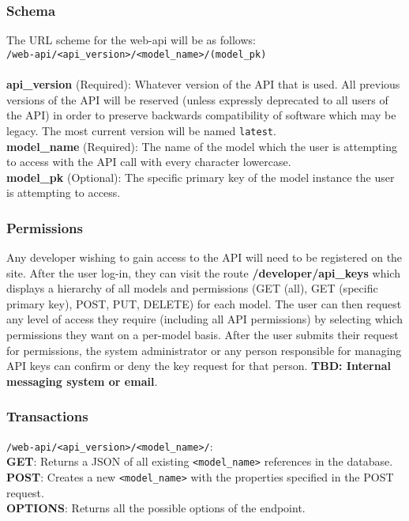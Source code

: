 \documentclass{article}
\begin{document}
\subsubsection{Schema}
The URL scheme for the web-api will be as follows:
\\ \texttt{/web-api/<api\_version>/<model\_name>/(model\_pk)}
\\
\\
\textbf{api\_version} (Required): Whatever version of the API that is used. All
previous versions of the API will be reserved (unless expressly deprecated to
all users of the API) in order to preserve backwards compatibility of software
which may be legacy. The most current version will be named \texttt{latest}.
\\
\textbf{model\_name} (Required): The name of the model which the user is
attempting to access with the API call with every character lowercase.
\\
\textbf{model\_pk} (Optional): The specific primary key of the model instance
the user is attempting to access. %

\subsubsection{Permissions}
Any developer wishing to gain access to the API will need to be registered on
the site. After the user log-in, they can visit the route
\textbf{/developer/api\_keys} which displays a hierarchy of all models and
permissions (GET (all), GET (specific primary key), POST, PUT, DELETE) for each
model. The user can then request any level of access they require (including
all API permissions) by selecting which permissions they want on a per-model
basis. After the user submits their request for permissions, the system
administrator or any person responsible for managing API keys can confirm or
deny the key request for that person. \textbf{TBD: Internal messaging system or
email}. %

\subsubsection{Transactions}
\texttt{/web-api/<api\_version>/<model\_name>/}:
\\
\textbf{GET}: Returns a JSON of all existing \texttt{<model\_name>} references in the
database.
\\
\textbf{POST}: Creates a new \texttt{<model\_name>} with the properties specified in the
POST request.
\\
\textbf{OPTIONS}: Returns all the possible options of the endpoint.
\end{document}

